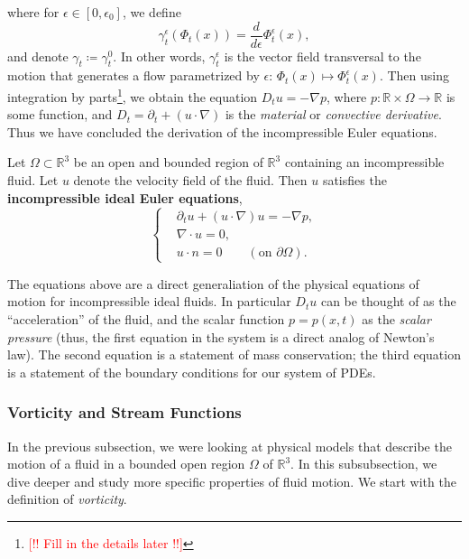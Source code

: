 \documentclass{article}
\begin{document}
where for $\epsilon \in [0,\epsilon_{0}]$, we define 
\begin{equation*}
	\gamma_{t}^{\epsilon}(\Phi_{t}(x)) = \frac{d}{d\epsilon}\Phi_{t}^{\epsilon}(x), 
\end{equation*}
and denote $\gamma_{t} \coloneqq \gamma_{t}^{0}$. In other words, $\gamma_{t}^{\epsilon}$ is the vector field transversal to the motion that generates a flow parametrized by $\epsilon$: $\Phi_{t}(x) \mapsto \Phi_{t}^{\epsilon}(x)$. Then using integration by parts\footnote{\textcolor{red}{[!! Fill in the details later !!]}}, we obtain the equation $D_{t}u = -\nabla p$, where $p: \mathbb{R} \times \Omega  \to \mathbb{R}$ is some function, and $D_{t} = \partial_{t} + (u \cdot \nabla)$ is the \textit{material} or \textit{convective derivative}. Thus we have concluded the derivation of the incompressible Euler equations. 

\begin{prop}
	Let $\Omega \subset \mathbb{R}^{3}$ be an open and bounded region of $\mathbb{R}^{3}$ containing an incompressible fluid. Let $u$ denote the velocity field of the fluid. Then $u$ satisfies the \textbf{incompressible ideal Euler equations}, 
	\begin{equation}
		\left\{
		\begin{alignedat}{1}
			&\partial_{t}u + (u \cdot \nabla) u = -\nabla p, \\
			&\nabla \cdot u = 0, \\
			&u \cdot n = 0 \qquad (\text{on $\partial \Omega$}).
		\end{alignedat} 
		\right. 
	\end{equation}
\end{prop} 

The equations above are a direct generaliation of the physical equations of motion for incompressible ideal fluids. In particular $D_{t}u$ can be thought of as the ``acceleration'' of the fluid, and the scalar function $p = p(x, t)$ as the \textit{scalar pressure} (thus, the first equation in the system is a direct analog of Newton's law). The second equation is a statement of mass conservation; the third equation is a statement of the boundary conditions for our system of PDEs. 

\subsubsection{Vorticity and Stream Functions}
In the previous subsection, we were looking at physical models that describe the motion of a fluid in a bounded open region $\Omega$ of $\mathbb{R}^{3}$. In this subsubsection, we dive deeper and study more specific properties of fluid motion. We start with the definition of \textit{vorticity}. 
\end{document}
